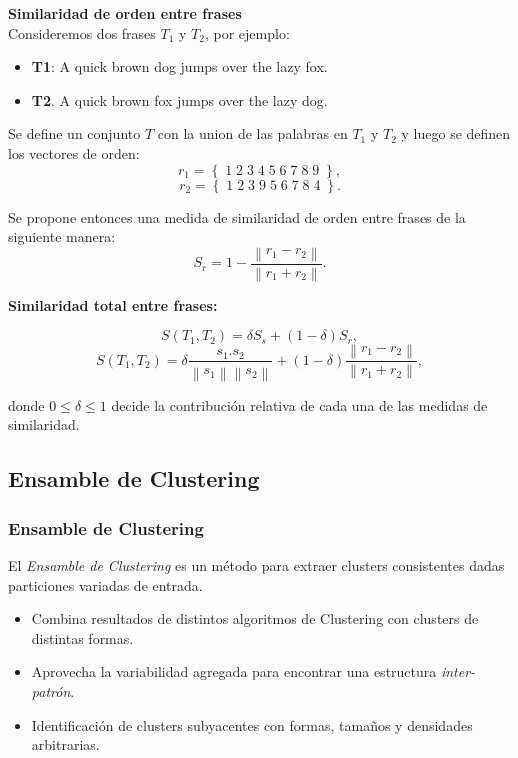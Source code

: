\begin{frame}[allowframebreaks]
	\framebreak

	\textbf{Similaridad de orden entre frases} \\
	\bigskip
	Consideremos dos frases \(T_1\) y \(T_2\), por ejemplo:
	\begin{itemize}[<*>]
		\item \textbf{T1}: A quick brown dog jumps over the lazy fox.
		\item \textbf{T2}. A quick brown fox jumps over the lazy dog.
	\end{itemize}

	\bigskip
	Se define un conjunto \(T\) con la union de las palabras en \(T_1\) y \(T_2\) y luego se definen los vectores de orden:
	\[r_1 = \left \{\;1\;2\;3\;4\;5\;6\;7\;8\;9\;\right \},\]
	\[r_2 = \left \{\;1\;2\;3\;9\;5\;6\;7\;8\;4\;\right \}.\]

	Se propone entonces una medida de similaridad de orden entre frases de la siguiente manera:
	\[S_r = 1 - \frac{\left \| r_1 - r_2 \right \|}{\left \| r_1 + r_2 \right \|}.\]

	\framebreak

	\textbf{Similaridad total entre frases:} \\
	\bigskip

	\[S(T_1, T_2)=\delta S_s + (1 - \delta)S_r,\]
	\[S(T_1, T_2)=\delta \frac{s_1.s_2}{\left \| s_1 \right \|\left \| s_2 \right \|} + (1 - \delta)\frac{\left \|r_1-r_2 \right \|}{\left \| r_1+r_2 \right \|},\]

	\bigskip
	donde \(0 \leq \delta \leq 1\) decide la contribución relativa de cada una de las medidas de similaridad.
\end{frame}

\subsection{Ensamble de Clustering}
\begin{frame}
	\frametitle{Ensamble de Clustering}
	\begin{tcolorbox}[colback=blue!5,colframe=blue!40!black,title=Ensamble de Clustering]
		El \textit{Ensamble de Clustering} es un método para extraer clusters consistentes dadas particiones variadas de entrada.
	\end{tcolorbox}

 	\bigskip

	\begin{itemize}
		\item Combina resultados de distintos algoritmos de Clustering con clusters de distintas formas.
		\item Aprovecha la variabilidad agregada para encontrar una estructura \textit{inter-patrón}.
		\item Identificación de clusters subyacentes con formas, tamaños y densidades arbitrarias.
	\end{itemize}
\end{frame}

